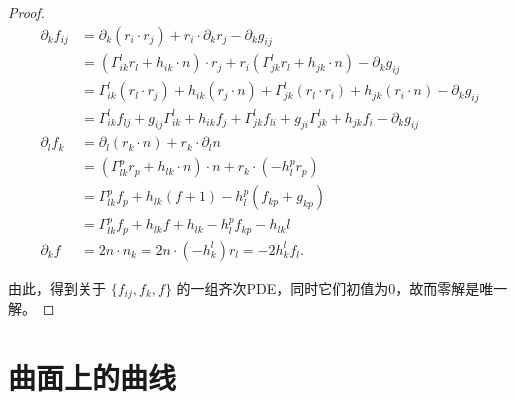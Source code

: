 \documentclass[lang=cn,10pt,thmcnt=section]{elegantbook}
\begin{document}
\begin{proof}
\begin{align*}
    \partial_k f_{ij} &= \partial_k (r_i \cdot r_j) + r_i \cdot \partial_k r_j - \partial_k g_{ij} \\
    &= (\Gamma_{ik}^l r_l + h_{ik} \cdot n) \cdot r_j + r_i (\Gamma_{jk}^l r_l + h_{jk} \cdot n) - \partial_k g_{ij} \\
    &= \Gamma_{ik}^l (r_l \cdot r_j) + h_{ik} (r_j \cdot n) + \Gamma_{jk}^l (r_l \cdot r_i) + h_{jk} (r_i \cdot n) - \partial_k g_{ij} \\
    &= \Gamma_{ik}^l f_{lj} + g_{ij} \Gamma_{ik}^l + h_{ik} f_j + \Gamma_{jk}^l f_{li} + g_{ji} \Gamma_{jk}^l + h_{jk} f_i - \partial_k g_{ij}\\
    \partial_l f_k &= \partial_l (r_k \cdot n) + r_k \cdot \partial_l n \\
    &= (\Gamma_{lk}^p r_p + h_{lk} \cdot n) \cdot n + r_k \cdot (- h_l^p r_p) \\
    &= \Gamma_{lk}^p f_p + h_{lk} (f + 1) - h_l^p (f_{kp} + g_{kp}) \\
    &= \Gamma_{lk}^p f_p + h_{lk} f + h_{lk} - h_l^p f_{kp} - h_{lk} l\\
    \partial_k f &= 2 n \cdot n_k = 2 n \cdot (-h_k^l) r_l = -2 h_k^l f_l.
\end{align*}

由此，得到关于 $\{f_{ij}, f_k, f\}$ 的一组齐次PDE，同时它们初值为0，故而零解是唯一解。
\end{proof} 
\chapter{曲面上的曲线}
\end{document}
